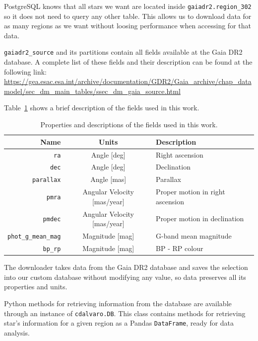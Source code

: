 \documentclass[11pt, a4paper, english]{book}
\begin{document}
PostgreSQL knows that all stars we want are located inside \verb|gaiadr2.region_302| so it does not need to query any other table.
This allows us to download data for as many regions as we want without loosing performance when accessing for that data.

\verb|gaiadr2_source| and its partitions contain all fields available at the Gaia DR2 database.
A complete list of these fields and their description can be found at the following link:
\sloppy\url{https://gea.esac.esa.int/archive/documentation/GDR2/Gaia_archive/chap_datamodel/sec_dm_main_tables/ssec_dm_gaia_source.html}

Table~\ref{tab:important_fields} shows a brief description of the fields used in this work.

\begin{table}[h!]
  \begin{center}
    \begin{tabular}{r|c|l}
      \textbf{Name} & \textbf{Units} & \textbf{Description} \\
      \hline
      \verb|ra| & Angle [deg] & Right ascension \\
      \verb|dec| & Angle [deg] & Declination \\
      \verb|parallax| & Angle [mas] & Parallax \\
      \verb|pmra| & Angular Velocity [mas/year] & Proper motion in right ascension \\
      \verb|pmdec| & Angular Velocity [mas/year] & Proper motion in declination \\
      \verb|phot_g_mean_mag| & Magnitude [mag] & G-band mean magnitude \\
      \verb|bp_rp| & Magnitude [mag] & BP - RP colour \\
    \end{tabular}
    \caption{Properties and descriptions of the fields used in this work.}
    \label{tab:important_fields}
  \end{center}
\end{table}

The downloader takes data from the Gaia DR2 database and saves the selection into our custom database without modifying any value,
so data preserves all its properties and units.

Python methods for retrieving information from the database are available through an instance of \verb|cdalvaro.DB|.
This class contains methods for retrieving star's information for a given region as a Pandas \verb|DataFrame|, ready for data analysis.
\end{document}
